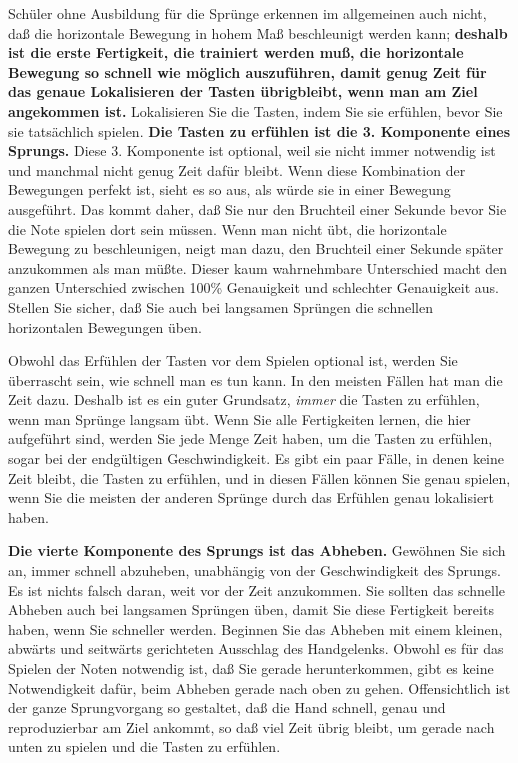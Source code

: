 Schüler ohne Ausbildung für die Sprünge erkennen im allgemeinen auch nicht, daß die horizontale Bewegung in hohem Maß beschleunigt werden kann; \textbf{deshalb ist die erste Fertigkeit, die trainiert werden muß, die horizontale Bewegung so schnell wie möglich auszuführen, damit genug Zeit für das genaue Lokalisieren der Tasten übrigbleibt, wenn man am Ziel angekommen ist.}
Lokalisieren Sie die Tasten, indem Sie sie erfühlen, bevor Sie sie tatsächlich spielen.
\textbf{Die Tasten zu erfühlen ist die 3. Komponente eines Sprungs.}
Diese 3. Komponente ist optional, weil sie nicht immer notwendig ist und manchmal nicht genug Zeit dafür bleibt.
Wenn diese Kombination der Bewegungen perfekt ist, sieht es so aus, als würde sie in einer Bewegung ausgeführt.
Das kommt daher, daß Sie nur den Bruchteil einer Sekunde bevor Sie die Note spielen dort sein müssen.
Wenn man nicht übt, die horizontale Bewegung zu beschleunigen, neigt man dazu, den Bruchteil einer Sekunde später anzukommen als man müßte.
Dieser kaum wahrnehmbare Unterschied macht den ganzen Unterschied zwischen 100\% Genauigkeit und schlechter Genauigkeit aus.
Stellen Sie sicher, daß Sie auch bei langsamen Sprüngen die schnellen horizontalen Bewegungen üben.

Obwohl das Erfühlen der Tasten vor dem Spielen optional ist, werden Sie überrascht sein, wie schnell man es tun kann.
In den meisten Fällen hat man die Zeit dazu.
Deshalb ist es ein guter Grundsatz, \textit{immer} die Tasten zu erfühlen, wenn man Sprünge langsam übt.
Wenn Sie alle Fertigkeiten lernen, die hier aufgeführt sind, werden Sie jede Menge Zeit haben, um die Tasten zu erfühlen, sogar bei der endgültigen Geschwindigkeit.
Es gibt ein paar Fälle, in denen keine Zeit bleibt, die Tasten zu erfühlen, und in diesen Fällen können Sie genau spielen, wenn Sie die meisten der anderen Sprünge durch das Erfühlen genau lokalisiert haben.

\textbf{Die vierte Komponente des Sprungs ist das Abheben.}
Gewöhnen Sie sich an, immer schnell abzuheben, unabhängig von der Geschwindigkeit des Sprungs.
Es ist nichts falsch daran, weit vor der Zeit anzukommen.
Sie sollten das schnelle Abheben auch bei langsamen Sprüngen üben, damit Sie diese Fertigkeit bereits haben, wenn Sie schneller werden.
Beginnen Sie das Abheben mit einem kleinen, abwärts und seitwärts gerichteten Ausschlag des Handgelenks.
Obwohl es für das Spielen der Noten notwendig ist, daß Sie gerade herunterkommen, gibt es keine Notwendigkeit dafür, beim Abheben gerade nach oben zu gehen.
Offensichtlich ist der ganze Sprungvorgang so gestaltet, daß die Hand schnell, genau und reproduzierbar am Ziel ankommt, so daß viel Zeit übrig bleibt, um gerade nach unten zu spielen und die Tasten zu erfühlen.

